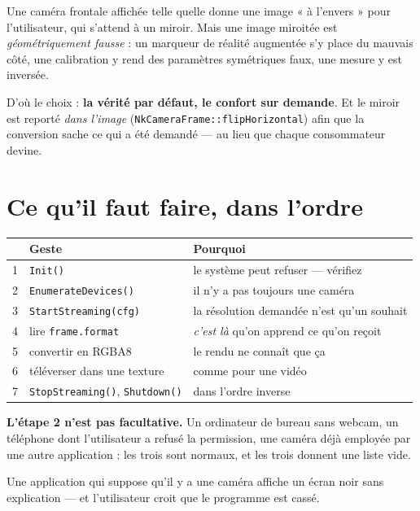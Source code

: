 \begin{nkretenir}
Une caméra frontale affichée telle quelle donne une image « à l'envers » pour
l'utilisateur, qui s'attend à un miroir. Mais une image miroitée est
\emph{géométriquement fausse} : un marqueur de réalité augmentée s'y place du
mauvais côté, une calibration y rend des paramètres symétriques faux, une mesure
y est inversée.

D'où le choix : \textbf{la vérité par défaut, le confort sur demande}. Et le
miroir est reporté \emph{dans l'image} (\texttt{NkCameraFrame::flipHorizontal})
afin que la conversion sache ce qui a été demandé --- au lieu que chaque
consommateur devine.
\end{nkretenir}

\section{Ce qu'il faut faire, dans l'ordre}

\begin{center}
\begin{tabular}{@{}rll@{}}
\toprule
& \textbf{Geste} & \textbf{Pourquoi} \\
\midrule
1 & \texttt{Init()} & le système peut refuser --- vérifiez \\
2 & \texttt{EnumerateDevices()} & il n'y a pas toujours une caméra \\
3 & \texttt{StartStreaming(cfg)} & la résolution demandée n'est qu'un souhait \\
4 & lire \texttt{frame.format} & \emph{c'est là} qu'on apprend ce qu'on reçoit \\
5 & convertir en RGBA8 & le rendu ne connaît que ça \\
6 & téléverser dans une texture & comme pour une vidéo \\
7 & \texttt{StopStreaming()}, \texttt{Shutdown()} & dans l'ordre inverse \\
\bottomrule
\end{tabular}
\end{center}

\begin{nkpiege}
\textbf{L'étape 2 n'est pas facultative.} Un ordinateur de bureau sans webcam, un
téléphone dont l'utilisateur a refusé la permission, une caméra déjà employée par
une autre application : les trois sont normaux, et les trois donnent une liste
vide.

Une application qui suppose qu'il y a une caméra affiche un écran noir sans
explication --- et l'utilisateur croit que le programme est cassé.
\end{nkpiege}

